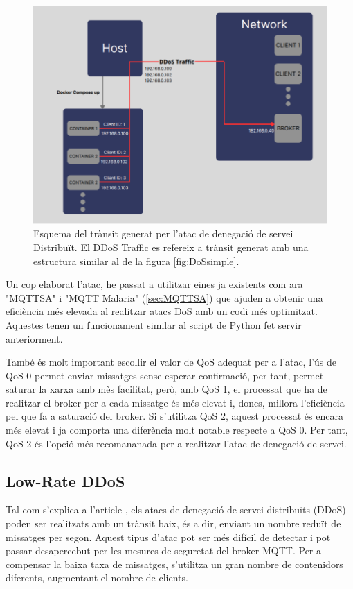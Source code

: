   \begin{figure}[H]
    \centering
    \includegraphics[width=1\textwidth]{img/DDoS.png}
    \caption{Esquema del trànsit generat per l'atac de denegació de servei Distribuït. El DDoS Traffic es refereix a trànsit generat amb una estructura similar al de la figura \ref{fig:DoSsimple}.}
    \label{fig:DDoS}
  \end{figure}

Un cop elaborat l'atac, he passat a utilitzar eines ja existents com ara "MQTTSA" i "MQTT Malaria" (\ref{sec:MQTTSA}) que ajuden a obtenir una eficiència més elevada al realitzar atacs DoS amb un codi més optimitzat. Aquestes tenen un funcionament similar al script de Python fet servir anteriorment.

També és molt important escollir el valor de QoS adequat per a l'atac, l'ús de QoS 0 permet enviar missatges sense esperar confirmació, per tant, permet saturar la xarxa amb mès facilitat, però, amb QoS 1, el processat que ha de realitzar el broker per a cada missatge és més elevat i, doncs, millora l'eficiència pel que fa a saturació del broker. Si s'utilitza QoS 2, aquest processat és encara més elevat i ja comporta una diferència molt notable respecte a QoS 0. Per tant, QoS 2 és l'opció més recomananada per a realitzar l'atac de denegació de servei. 

\subsection{Low-Rate DDoS}

Tal com s'explica a l'article \cite{lowrateDDoSexp}, els atacs de denegació de servei distribuïts (DDoS) poden ser realitzats amb un trànsit baix, és a dir, enviant un nombre reduït de missatges per segon. Aquest tipus d'atac pot ser més difícil de detectar i pot passar desapercebut per les mesures de seguretat del broker MQTT. Per a compensar la baixa taxa de missatges, s'utilitza un gran nombre de contenidors diferents, augmentant el nombre de clients.


